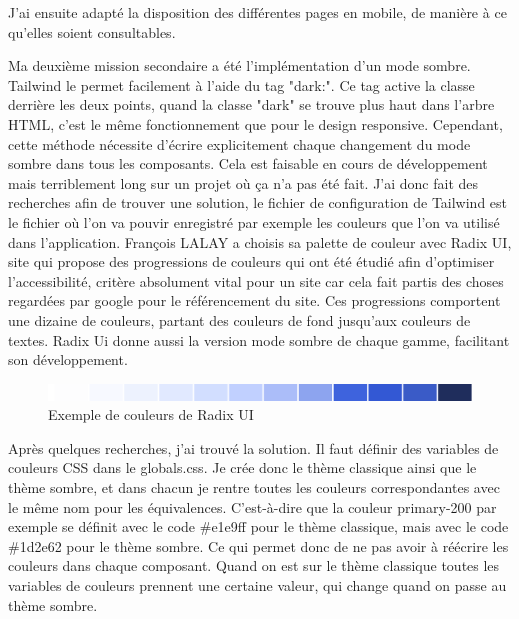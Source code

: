 \documentclass[a4paper,12pt]{report}
\begin{document}
J'ai ensuite adapté la disposition des différentes pages en mobile, de manière à ce qu'elles soient consultables. 

\vspace{1em}

Ma deuxième mission secondaire a été l'implémentation d'un mode sombre. Tailwind le permet facilement à l'aide du tag "dark:". Ce tag active la classe derrière les deux points, quand la classe "dark" se trouve plus haut dans l'arbre HTML, c'est le même fonctionnement que pour le design responsive. Cependant, cette méthode nécessite d'écrire explicitement chaque changement du mode sombre dans tous les composants. Cela est faisable en cours de développement mais terriblement long sur un projet où ça n'a pas été fait. J'ai donc fait des recherches afin de trouver une solution, le fichier de configuration de Tailwind est le fichier où l'on va pouvir enregistré par exemple les couleurs que l'on va utilisé dans l'application. François LALAY a choisis sa palette de couleur avec Radix UI, site qui propose des progressions de couleurs qui ont été étudié afin d'optimiser l'accessibilité, critère absolument vital pour un site car cela fait partis des choses regardées par google pour le référencement du site. Ces progressions comportent une dizaine de couleurs, partant des couleurs de fond jusqu'aux couleurs de textes. Radix Ui donne aussi la version mode sombre de chaque gamme, facilitant son développement.

\begin{figure}[H]
    \centering
    \includegraphics[scale=0.4]{colorRadixUi.png}
    \caption{Exemple de couleurs de Radix UI}
    \label{fig:radix-colors}
\end{figure}

Après quelques recherches, j'ai trouvé la solution. Il faut définir des variables de couleurs CSS dans le globals.css. Je crée donc le thème classique ainsi que le thème sombre, et dans chacun je rentre toutes les couleurs correspondantes avec le même nom pour les équivalences. C'est-à-dire que la couleur primary-200 par exemple se définit avec le code \#e1e9ff pour le thème classique, mais avec le code \#1d2e62 pour le thème sombre. Ce qui permet donc de ne pas avoir à réécrire les couleurs dans chaque composant. Quand on est sur le thème classique toutes les variables de couleurs prennent une certaine valeur, qui change quand on passe au thème sombre.
\end{document}
